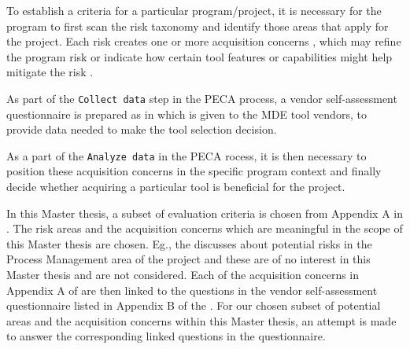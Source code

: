 To establish a criteria for a particular program/project, it is necessary for the program to first scan the risk taxonomy and identify those areas that apply for the project. Each risk creates one or more acquisition concerns , which may refine the program risk or indicate how certain tool features or capabilities might help mitigate the risk \cite{EvalCodeGen}.      

As part of the \texttt{Collect data} step in the PECA process, a vendor self-assessment questionnaire is prepared as in \cite{EvalCodeGen} which is given to the MDE tool vendors, to provide data needed to make the tool selection decision.

As a part of the \texttt{Analyze data} in the PECA rocess, it is then necessary to position these acquisition concerns in the specific program context and finally decide whether acquiring a particular tool is beneficial for the project.

In this Master thesis, a subset of evaluation criteria is chosen from Appendix A in \cite{EvalCodeGen}. The risk areas and the acquisition concerns which are meaningful in the scope of this Master thesis are chosen. Eg., the \cite{EvalCodeGen} discusses about potential risks in the Process Management area of the project and these are of no interest in this Master thesis and are not considered. Each of the acquisition concerns in Appendix A of \cite{EvalCodeGen} are then linked to the questions in the vendor self-assessment questionnaire listed in Appendix B of the \cite{EvalCodeGen}. For our chosen subset of potential areas and the acquisition concerns within this Master thesis, an attempt is made to answer the corresponding linked questions in the questionnaire.

